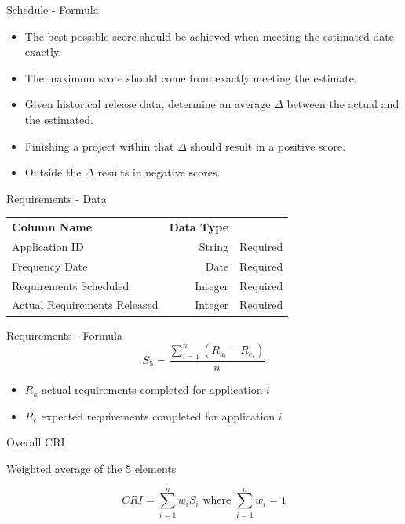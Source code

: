 \begin{frame}{Schedule - Formula}
    
    \begin{itemize}
    \item The best possible score should be achieved
            when meeting the estimated date exactly.
    \item The maximum score
            should come from exactly meeting the estimate.
    \item Given historical
            release data, determine an 
            average $\Delta$ between the actual and the estimated. 
    \item Finishing a project within that $\Delta$ should result 
            in a positive score.
    \item Outside the $\Delta$ results in
            negative scores. 
    \end{itemize}     
              
\end{frame}

\begin{frame}{Requirements - Data}
    
    \begin{tabular}{l | r | r}
        \textbf{Column Name} & \textbf{Data Type} &  \\
        
        Application ID & String  & Required \\
        Frequency Date & Date & Required \\
        Requirements Scheduled & Integer & Required \\
        Actual Requirements Released & Integer  & Required \\
    \end{tabular}
\end{frame}

\begin{frame}{Requirements - Formula}
    \[
        S_5 = \frac{\sum^n_{i=1}\left( R_{a_i} - R_{e_i} \right)}{n}
    \]
    \begin{itemize}
        \item $R_a$ actual requirements completed for application $i$
        \item $R_e$ expected requirements completed for application $i$
    \end{itemize}
\end{frame}

\begin{frame}{Overall CRI}

Weighted average of the 5 elements
    
\[
    CRI =\sum\limits^n_{i=1} w_i S_i \text{  where } \sum\limits^n_{i=1} w_i = 1
\]
\end{frame}

